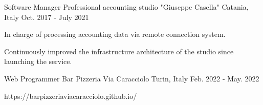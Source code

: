 

\begin{cventries}

  \cventry
    {Software Manager} %
    {Professional accounting studio "Giuseppe Casella"} %
    {Catania, Italy} %
    {Oct. 2017 - July 2021} %
    {
      \begin{cvitems} %
        \item {In charge of processing accounting data via remote connection system.}
        \item {Continuously improved the infrastructure architecture of the studio since launching the service.}
      \end{cvitems}
    }

  \cventry
    {Web Programmer} %
    {Bar Pizzeria Via Caracciolo} %
    {Turin, Italy} %
    {Feb. 2022 - May. 2022} %
    {
    	  \begin{cvitems} %
      \item {https://barpizzeriaviacaracciolo.github.io/}
      \end{cvitems}
    }
  

\end{cventries}
